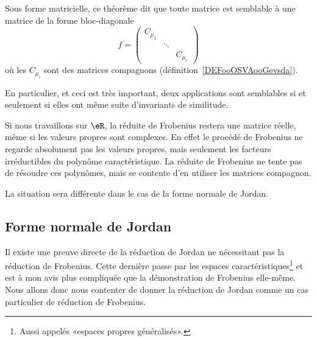 \begin{remark}      \label{REMooPVLEooYDRXQI}
	Sous forme matricielle, ce théorème dit que toute matrice est semblable à une matrice de la forme bloc-diagonale
	\begin{equation}
		f=\begin{pmatrix}
			C_{\mu_1} &        &           \\
			          & \ddots &           \\
			          &        & C_{\mu_r}
		\end{pmatrix}
	\end{equation}
	où les \( C_{\mu_i}\) sont des matrices compagnons (définition~\ref{DEFooOSVAooGevsda}).

	En particulier, et ceci est très important, deux applications sont semblables si et seulement si elles ont même suite d'invariants de similitude.
\end{remark}


\begin{remark}
	Si nous travaillons sur \( \eR\), la réduite de Frobenius restera une matrice réelle, même si les valeurs propres sont complexes. En effet le procédé de Frobenius ne regarde absolument pas les valeurs propres, mais seulement les facteurs irréductibles du polynôme caractéristique. La réduite de Frobenius ne tente pas de résoudre ces polynômes, mais se contente d'en utiliser les matrices compagnon.

	La situation sera différente dans le cas de la forme normale de Jordan.
\end{remark}

\subsection{Forme normale de Jordan}

Il existe une preuve directe de la réduction de Jordan ne nécessitant pas la réduction de Frobenius\cite{LecLinAlgAllen}. Cette dernière passe par les espaces caractéristiques\footnote{Aussi appelés «espaces propres généralisés».} et est à mon avis plus compliquée que la démonstration de Frobenius elle-même. Nous allons donc nous contenter de donner la réduction de Jordan comme un cas particulier de réduction de Frobenius.

